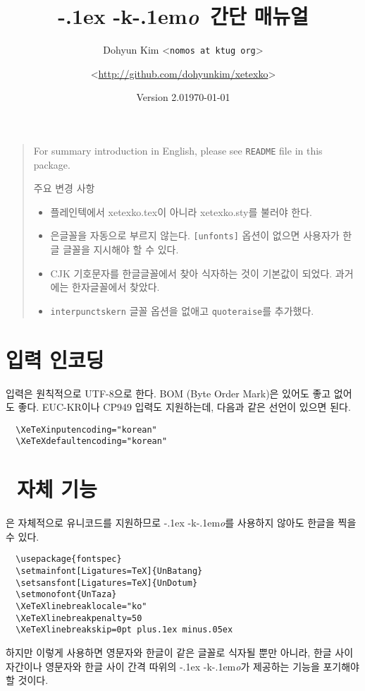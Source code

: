 \documentclass[a4paper]{article}
\def\logoko{\textsf{k}\kern-.1em\textit{o}}
\def\xetexko{\XeTeX\kern-.1ex -\logoko}
\begin{document}
\title{\xetexko\ 간단 매뉴얼}
\author{Dohyun Kim \normalsize <\texttt{nomos at ktug org}> \and
  \normalsize <\url{http://github.com/dohyunkim/xetexko}>}
\date{Version 2.0\quad\today}
\maketitle

\begin{quote}\small
  For summary introduction in English,
  please see \verb+README+ file in this package.

  주요 변경 사항
  \begin{itemize}\itemsep=0pt
      \item 플레인텍에서 xetexko.tex이 아니라 xetexko.sty를 불러야 한다.
    \item 은글꼴을 자동으로 부르지 않는다. \verb+[unfonts]+ 옵션이 없으면
      사용자가 한글 글꼴을 지시해야 할 수 있다.
    \item CJK 기호문자를 한글글꼴에서 찾아 식자하는 것이 기본값이 되었다.
      과거에는 한자글꼴에서 찾았다.
    \item \verb|interpunctskern| 글꼴 옵션을 없애고
      \verb|quoteraise|를 추가했다.
  \end{itemize}
\end{quote}

\section{입력 인코딩}
입력은 원칙적으로 UTF-8으로 한다.
BOM (Byte Order Mark)은 있어도 좋고 없어도 좋다.
EUC-KR이나 CP949 입력도 지원하는데, 다음과 같은 선언이 있으면 된다.
\begin{verbatim}
  \XeTeXinputencoding="korean"
  \XeTeXdefaultencoding="korean"
\end{verbatim}

\section{\XeTeX\ 자체 기능}
\XeTeX 은 자체적으로 유니코드를 지원하므로 \xetexko 를 사용하지
않아도 한글을 찍을 수 있다.
\begin{verbatim}
  \usepackage{fontspec}
  \setmainfont[Ligatures=TeX]{UnBatang}
  \setsansfont[Ligatures=TeX]{UnDotum}
  \setmonofont{UnTaza}
  \XeTeXlinebreaklocale="ko"
  \XeTeXlinebreakpenalty=50
  \XeTeXlinebreakskip=0pt plus.1ex minus.05ex
\end{verbatim}
하지만 이렇게 사용하면 영문자와 한글이 같은 글꼴로 식자될 뿐만 아니라,
한글 사이 자간이나 영문자와 한글 사이 간격 따위의 \xetexko 가 제공하는
기능을 포기해야 할 것이다.
\end{document}

